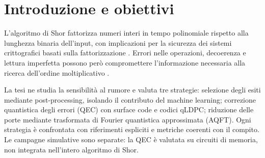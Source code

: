 \section{Introduzione e obiettivi}

L'algoritmo di Shor fattorizza numeri interi in tempo polinomiale rispetto alla lunghezza
binaria dell'input, con implicazioni per la sicurezza dei sistemi crittografici basati sulla
fattorizzazione \cite{shor1994,nist2024pqc,gidney2021}. Errori nelle operazioni, decoerenza e
lettura imperfetta possono però compromettere l'informazione necessaria alla ricerca
dell'ordine moltiplicativo \cite{preskill2018}.

La tesi ne studia la sensibilità al rumore e valuta tre strategie: selezione degli esiti
mediante post-processing, isolando il contributo del machine learning; correzione quantistica
degli errori (QEC) con surface code e codici qLDPC; riduzione delle porte mediante trasformata
di Fourier quantistica approssimata (AQFT). Ogni strategia è confrontata con riferimenti
espliciti e metriche coerenti con il compito. Le campagne simulative sono separate: la QEC è
valutata su circuiti di memoria, non integrata nell'intero algoritmo di Shor.
